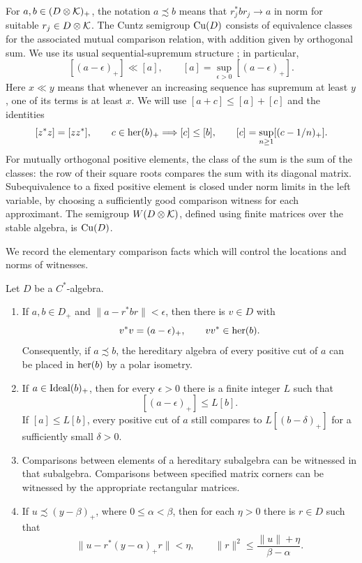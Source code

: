 For \(a,b\in(D\otimes\mathcal K)_+\), the notation \(a\precsim b\) means that
\(r_j^*br_j\to a\) in norm for suitable \(r_j\in D\otimes\mathcal K\).
The Cuntz semigroup \(\mathrm{Cu}(D)\) consists of equivalence classes for the
associated mutual comparison relation, with addition given by
orthogonal sum. We use its usual sequential-supremum structure
\cite{CEI2008}; in particular,
\begin{equation}
\label{eq:pre:cuts}
 [(a-\epsilon)_+]\ll[a],
 \qquad [a]=\sup_{\epsilon>0}[(a-\epsilon)_+].
\end{equation}
Here \(x\ll y\) means that whenever an increasing sequence has
supremum at least \(y\), one of its terms is at least \(x\).
We will use $[a+c]\le[a]+[c]$ and the identities
\begin{equation}
\label{ext:eq:cu-facts}
 [z^*z]=[zz^*],\qquad
 c\in\operatorname{her}(b)_+\Longrightarrow[c]\le[b],\qquad
 [c]=\sup_{n\ge1}[(c-1/n)_+].
\end{equation}
For mutually orthogonal positive elements, the class of the sum is the
sum of the classes: the row of their square roots compares the sum with
its diagonal matrix. Subequivalence to a fixed positive element is closed
under norm limits in the left variable, by choosing a sufficiently good
comparison witness for each approximant.
The semigroup \(W(D\otimes\mathcal K)\), defined using finite matrices over the
stable algebra, is \(\mathrm{Cu}(D)\).

We record the elementary comparison facts which will control the
locations and norms of witnesses.

\begin{lemma}
\label{lem:pre:cut-placement}
Let \(D\) be a \(C^*\)-algebra.
\begin{enumerate}
\item If \(a,b\in D_+\) and \(\|a-r^*br\|<\epsilon\), then there is
\(v\in D\) with
\[
 v^*v=(a-\epsilon)_+,\qquad vv^*\in\operatorname{her}(b).
\]
Consequently, if \(a\precsim b\), the hereditary algebra of every
positive cut of \(a\) can be placed in \(\operatorname{her}(b)\) by a polar
isometry.
\item If \(a\in\operatorname{Ideal}(b)_+\), then for every \(\epsilon>0\) there is
a finite integer \(L\) such that
\[
 [(a-\epsilon)_+]\le L[b].
\]
If \([a]\le L[b]\), every positive cut of \(a\) still compares to
\(L[(b-\delta)_+]\) for a sufficiently small \(\delta>0\).
\item Comparisons between elements of a hereditary subalgebra can
be witnessed in that subalgebra. Comparisons between specified
matrix corners can be witnessed by the appropriate rectangular
matrices.
\item If \(u\precsim(y-\beta)_+\), where \(0\le\alpha<\beta\), then for
each \(\eta>0\) there is \(r\in D\) such that
\[
 \|u-r^*(y-\alpha)_+r\|<\eta,\qquad
 \|r\|^2\le\frac{\|u\|+\eta}{\beta-\alpha}.
\]
\end{enumerate}
\end{lemma}

